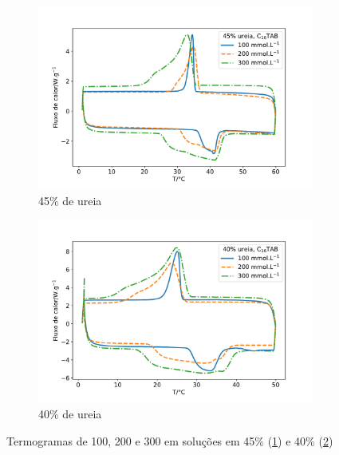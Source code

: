 	\begin{figure}[h]
		\begin{subfigure}[t]{0.5\textwidth}
			\centering
			\includegraphics[width=\textwidth]{./imagens/dsc/CTAB_45p}
			\caption{45\% de ureia}
			\label{fig:DSC_CTAB_UR45}
		\end{subfigure}  %
		\begin{subfigure}[t]{0.5\textwidth}
			\centering
			\includegraphics[width=\textwidth]{./imagens/dsc/CTAB_40p}
			\caption{40\% de ureia}
			\label{fig:DSC_CTAB_UR40}
		\end{subfigure}
		\caption{Termogramas de \CTAB{} 100, 200 e 300 \mM{} em soluções em 45\% (\ref{fig:DSC_CTAB_UR45}) e 40\% (\ref{fig:DSC_CTAB_UR40})}
		\label{fig:DSC_CTAB_UR40-45}
	\end{figure}

